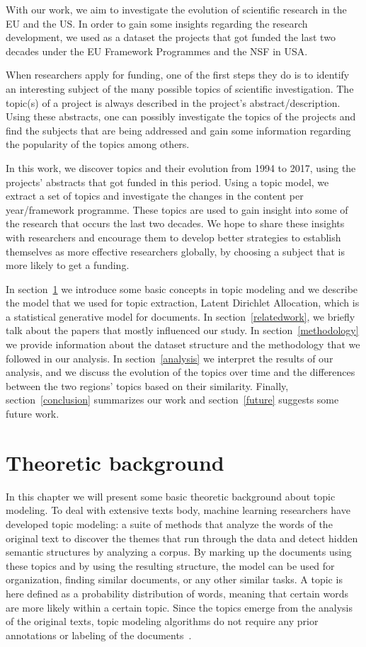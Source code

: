 \documentclass[12pt]{report}
\begin{document}
With our work, we aim to investigate the evolution of scientific
research in the EU and the US. In order to gain some insights  regarding
the research development, we used as a dataset the projects that got funded 
the last two decades under the EU Framework Programmes and the NSF in USA.

When researchers apply for funding, one of the first steps they do is
to identify an interesting subject of the many possible topics of
scientific investigation. The topic(s) of a project is always
described in the project's abstract/description. Using these abstracts, 
one can possibly investigate the topics of the projects and find the 
subjects that are being addressed and gain some information regarding 
the popularity of the topics among others.

In this work, we discover topics and their evolution from 1994 to
2017, using the projects' abstracts that got funded in this
period. Using a topic model, we extract a set of topics and
investigate the changes in the content per year/framework programme.
These topics are used to gain insight into some of the research that
occurs the last two decades. We hope to share these insights with
researchers and encourage them to develop better strategies to
establish themselves as more effective researchers globally, by
choosing a subject that is more likely to get a funding.

In section~\ref{theoretic} we introduce some basic concepts
in topic modeling and we describe the model that we used for topic
extraction, Latent Dirichlet Allocation, which is a statistical
generative model for documents. In section~\ref{relatedwork}, 
we briefly talk about the papers that mostly influenced our study. 
In section~\ref{methodology} we provide information
about the dataset structure and the methodology that we followed in
our analysis. In section~\ref{analysis} we interpret the results of 
our analysis, and we discuss the evolution of the topics over time and the
differences between the two regions' topics based on their similarity.
Finally, section~\ref{conclusion} summarizes our work and section~\ref{future} suggests some future work.

\section{Theoretic background}
\label{theoretic}
In this chapter we will present some basic theoretic background about
topic modeling. To deal with extensive texts body, machine learning 
researchers have developed topic modeling:
a suite of methods that analyze the words of the original text to
discover the themes that run through the data and detect hidden
semantic structures by analyzing a corpus. By marking up the documents
using these topics and by using the resulting structure, the model can
be used for organization, finding similar documents, or any other
similar tasks. A topic is here defined as a probability distribution
of words, meaning that certain words are more likely within a certain
topic. Since the topics emerge from the analysis of the original
texts, topic modeling algorithms do not require any prior annotations
or labeling of the documents~\cite{Blei11introductionto}.
\end{document}
